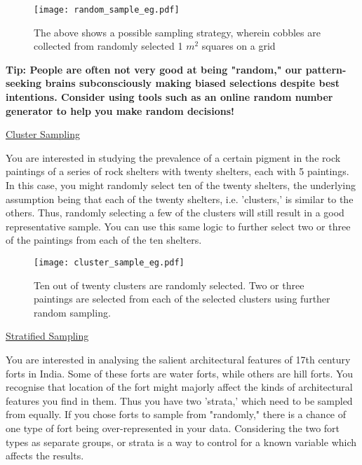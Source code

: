 \documentclass{article}
\begin{document}
\begin{figure}[hbt!]
    \centering
    \texttt{[image: random\_sample\_eg.pdf]}
    \caption{The above shows a possible sampling strategy, wherein cobbles are collected from randomly selected 1 \(m^2\) squares on a grid}
    \label{fig:random_sample_eg}
\end{figure}

\vspace{0.5cm}
\begin{singlespace*}
\textbf{Tip: People are often not very good at being "random," our pattern-seeking brains subconsciously making biased selections despite best intentions. Consider using tools such as an online random number generator to help you make random decisions!}
\end{singlespace*}
\vspace{0.5cm}
\underline{Cluster Sampling}

You are interested in studying the prevalence of a certain pigment in the rock paintings of a series of rock shelters with twenty shelters, each with 5 paintings. In this case, you might randomly select ten of the twenty shelters, the underlying assumption being that each of the twenty shelters, i.e. 'clusters,' is similar to the others. Thus, randomly selecting a few of the clusters will still result in a good representative sample. You can use this same logic to further select two or three of the paintings from each of the ten shelters.

\begin{figure}[hbt!]
    \centering
    \texttt{[image: cluster\_sample\_eg.pdf]}
    \caption{Ten out of twenty clusters are randomly selected. Two or three paintings are selected from each of the selected clusters using further random sampling.}
    \label{fig:cluster_sample_eg}
\end{figure}
\newpage
\underline{Stratified Sampling}

You are interested in analysing the salient architectural features of 17th century forts in India. Some of these forts are water forts, while others are hill forts. You recognise that location of the fort might majorly affect the kinds of architectural features you find in them. Thus you have two 'strata,' which need to be sampled from equally. If you chose forts to sample from "randomly," there is a chance of one type of fort being over-represented in your data. Considering the two fort types as separate groups, or strata is a way to control for a known variable which affects the results. 
\end{document}
